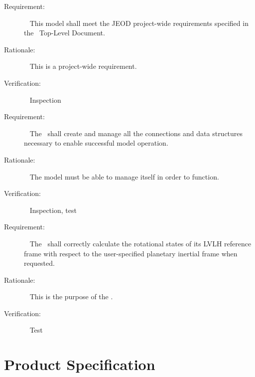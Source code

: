 \label{reqt:toplevel}
\begin{description}
\item[Requirement:]\ \newline
  This model shall meet the JEOD project-wide requirements specified in
  the \JEODid\ Top-Level Document.

\item[Rationale:]\ \newline
  This is a project-wide requirement.

\item[Verification:]\ \newline
  Inspection
\end{description}


\label{reqt:lvlhmanage}
\begin{description}
\item[Requirement:]\ \newline
  The \LvlhFrameDesc\ shall create and manage all the connections and
  data structures necessary to enable successful model operation.

\item[Rationale:]\ \newline
  The model must be able to manage itself in order to function.

\item[Verification:]\ \newline
  Inspection, test
\end{description}


\label{reqt:lvlhdefine}
\begin{description}
\item[Requirement:]\ \newline
  The \LvlhFrameDesc\ shall correctly calculate the rotational states of
  its LVLH reference frame with respect to the user-specified planetary
  inertial frame when requested.

\item[Rationale:]\ \newline
  This is the purpose of the \LvlhFrameDesc.

\item[Verification:]\ \newline
Test
\end{description}


\chapter{Product Specification}\label{ch:spec}

